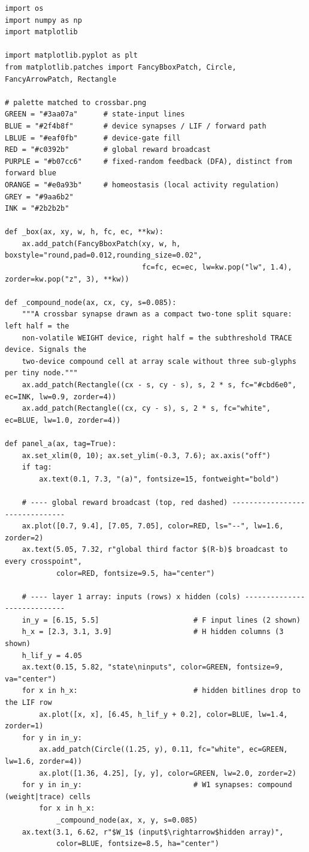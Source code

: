 \begin{lstlisting}[caption={schematics.ipynb code cell 8},label={lst:mrl-nb-schematics-8}]
import os
import numpy as np
import matplotlib

import matplotlib.pyplot as plt
from matplotlib.patches import FancyBboxPatch, Circle, FancyArrowPatch, Rectangle

# palette matched to crossbar.png
GREEN = "#3aa07a"      # state-input lines
BLUE = "#2f4b8f"       # device synapses / LIF / forward path
LBLUE = "#eaf0fb"      # device-gate fill
RED = "#c0392b"        # global reward broadcast
PURPLE = "#b07cc6"     # fixed-random feedback (DFA), distinct from forward blue
ORANGE = "#e0a93b"     # homeostasis (local activity regulation)
GREY = "#9aa6b2"
INK = "#2b2b2b"

def _box(ax, xy, w, h, fc, ec, **kw):
    ax.add_patch(FancyBboxPatch(xy, w, h, boxstyle="round,pad=0.012,rounding_size=0.02",
                                fc=fc, ec=ec, lw=kw.pop("lw", 1.4), zorder=kw.pop("z", 3), **kw))

def _compound_node(ax, cx, cy, s=0.085):
    """A crossbar synapse drawn as a compact two-tone split square: left half = the
    non-volatile WEIGHT device, right half = the subthreshold TRACE device. Signals the
    two-device compound cell at array scale without three sub-glyphs per tiny node."""
    ax.add_patch(Rectangle((cx - s, cy - s), s, 2 * s, fc="#cbd6e0", ec=INK, lw=0.9, zorder=4))
    ax.add_patch(Rectangle((cx, cy - s), s, 2 * s, fc="white", ec=BLUE, lw=1.0, zorder=4))

def panel_a(ax, tag=True):
    ax.set_xlim(0, 10); ax.set_ylim(-0.3, 7.6); ax.axis("off")
    if tag:
        ax.text(0.1, 7.3, "(a)", fontsize=15, fontweight="bold")

    # ---- global reward broadcast (top, red dashed) -------------------------------
    ax.plot([0.7, 9.4], [7.05, 7.05], color=RED, ls="--", lw=1.6, zorder=2)
    ax.text(5.05, 7.32, r"global third factor $(R-b)$ broadcast to every crosspoint",
            color=RED, fontsize=9.5, ha="center")

    # ---- layer 1 array: inputs (rows) x hidden (cols) ----------------------------
    in_y = [6.15, 5.5]                      # F input lines (2 shown)
    h_x = [2.3, 3.1, 3.9]                   # H hidden columns (3 shown)
    h_lif_y = 4.05
    ax.text(0.15, 5.82, "state\ninputs", color=GREEN, fontsize=9, va="center")
    for x in h_x:                           # hidden bitlines drop to the LIF row
        ax.plot([x, x], [6.45, h_lif_y + 0.2], color=BLUE, lw=1.4, zorder=1)
    for y in in_y:
        ax.add_patch(Circle((1.25, y), 0.11, fc="white", ec=GREEN, lw=1.6, zorder=4))
        ax.plot([1.36, 4.25], [y, y], color=GREEN, lw=2.0, zorder=2)
    for y in in_y:                          # W1 synapses: compound (weight|trace) cells
        for x in h_x:
            _compound_node(ax, x, y, s=0.085)
    ax.text(3.1, 6.62, r"$W_1$ (input$\rightarrow$hidden array)",
            color=BLUE, fontsize=8.5, ha="center")


\end{lstlisting}

